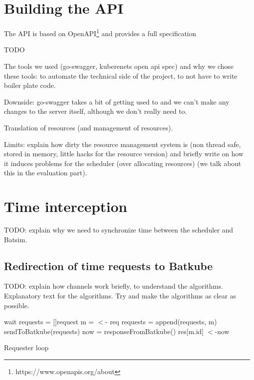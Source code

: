 \section{Building the API}

The API is based on OpenAPI\footnote{https://www.openapis.org/about} and provides a full specification\

TODO

The tools we used (go-swagger, kuberenets open api spec) and why we chose
these tools: to automate the technical side of the project, to not have to
write boiler plate code.

Downside: go-swagger takes a bit of getting used to
and we can't make any changes to the server itself, although we don't really
need to.  

Translation of resources (and management of resources).

Limits: explain how dirty the resource management system is (non
thread safe, stored in memory, little hacks for the resource version) and
briefly write on how it induces problems for the scheduler (over allocating
resources) (we talk about this in the evaluation part).

\section{Time interception}

TODO: explain why we need to synchronize time between the scheduler and Batsim.

\subsection{Redirection of time requests to Batkube}

TODO: explain how channels work briefly, to understand the algorithms.
Explanatory text for the algorithms. Try and make the algorithms as clear as possible.



\begin{algorithm}[H]
\DontPrintSemicolon
{}
 {
	wait\;
}
requests = []request\;
 {
	m = $<$- req 
	requests = append(requests, m)\;
}
sendToBatkube(requests) 
now = responseFromBatkube()\;
 {
	res[m.id] $<$-now 
}

	
\caption{Requester loop}
\label{alg:reqLoop}
\end{algorithm}


